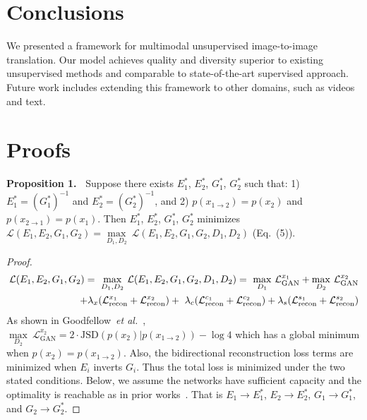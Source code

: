\documentclass[runningheads]{llncs}
\newcommand{\oneshot}[2]{\noindent\textbf{Proposition {#1}.\ }{#2}}
\def\etal{\emph{et al.}\xspace}
\begin{document}
\section{Conclusions}
We presented a framework for multimodal unsupervised image-to-image translation. Our model achieves quality and diversity superior to existing unsupervised methods and comparable to state-of-the-art supervised approach. Future work includes extending this framework to other domains, such as videos and text.




	
	

	\appendix
	\section{Proofs}
	\label{app:proofs}
	
	\oneshot{1}{
		Suppose there exists $E^{*}_{1}$, $E^{*}_{2}$, $G^{*}_{1}$, $G^{*}_{2}$ such that: 1) $E^{*}_{1} = (G^{*}_{1})^{-1}$ and $E^{*}_{2} = (G^{*}_{2})^{-1}$, and 2) $p(x_{1\rightarrow 2}) = p(x_{2})$ and $p(x_{2\rightarrow 1}) = p(x_{1})$. Then $E^{*}_{1}$, $E^{*}_{2}$, $G^{*}_{1}$, $G^{*}_{2}$ minimizes $\mathcal{L}(E_{1}, E_{2}, G_{1}, G_{2})=\underset{D_{1}, D_{2}}\max\ \mathcal{L}(E_{1}, E_{2}, G_{1}, G_{2}, D_{1}, D_{2})$ (Eq.~(5)).
	}
\begin{proof}
		\begin{align}
		\mathcal{L}(E_{1}, E_{2}, G_{1}, G_{2})=\ \underset{D_{1}, D_{2}}\max\ \mathcal{L}(E_{1}, E_{2}, G_{1}, G_{2}, D_{1}, D_{2})\notag =\ \underset{D_{1}}\max\ \mathcal{L}^{x_{1}}_{\text{GAN}} + \underset{D_{2}}\max\ \mathcal{L}^{x_{2}}_{\text{GAN}}\\+
		\lambda_{x}(\mathcal{L}^{x_{1}}_{\text{recon}}+\mathcal{L}^{x_{2}}_{\text{recon}})+\notag\ \lambda_{c}(\mathcal{L}^{c_{1}}_{\text{recon}}+\mathcal{L}^{c_{2}}_{\text{recon}})+\lambda_{s}(\mathcal{L}^{s_{1}}_{\text{recon}}+\mathcal{L}^{s_{2}}_{\text{recon}})\notag
		\end{align}
		As shown in Goodfellow~\etal~\cite{goodfellow2014generative}, $\underset{D_{2}}\max\ \mathcal{L}^{x_{2}}_{\text{GAN}}=2\cdot \text{JSD}(p(x_{2})|p(x_{1\rightarrow 2}))-\log4$ which has a global minimum when $p(x_{2})=p(x_{1\rightarrow 2})$. Also, the bidirectional reconstruction loss terms are minimized when $E_{i}$ inverts $G_{i}$. Thus the total loss is minimized under the two stated conditions. Below, we assume the networks have sufficient capacity and the optimality is reachable as in prior works~\cite{goodfellow2014generative,li2017alice}. That is $E_1\rightarrow E_1^*$, 	$E_2\rightarrow E_2^*$, $G_1\rightarrow G_1^*$, and $G_2\rightarrow G_2^*$.
	\end{proof}
\end{document}

